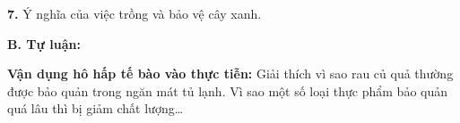 \documentclass[11pt,a4paper]{article}
\begin{document}
\par\vspace{1pt}\noindent\dotfill\par\vspace{3pt}\noindent\dotfill\par\vspace{3pt}\noindent\dotfill\par\vspace{3pt}\noindent
\textbf{7.} Ý nghĩa của việc trồng và bảo vệ cây xanh.
\par\vspace{1pt}\noindent\dotfill\par\vspace{3pt}\noindent\dotfill\par\vspace{3pt}\noindent\dotfill\par\vspace{3pt}\noindent
\vspace{4pt}
{\color{mySub}\textbf{B. Tự luận:}}

\textbf{Vận dụng hô hấp tế bào vào thực tiễn:} Giải thích vì sao rau củ quả thường được bảo quản trong ngăn mát tủ lạnh. Vì sao một số loại thực phẩm bảo quản quá lâu thì bị giảm chất lượng\dots
\par\vspace{1pt}\noindent\dotfill\par\vspace{3pt}\noindent\dotfill\par\vspace{3pt}\noindent\dotfill\par\vspace{3pt}\noindent\dotfill\par\vspace{3pt}\noindent\dotfill\par\vspace{3pt}\noindent\dotfill\par\vspace{3pt}\noindent
\end{document}
